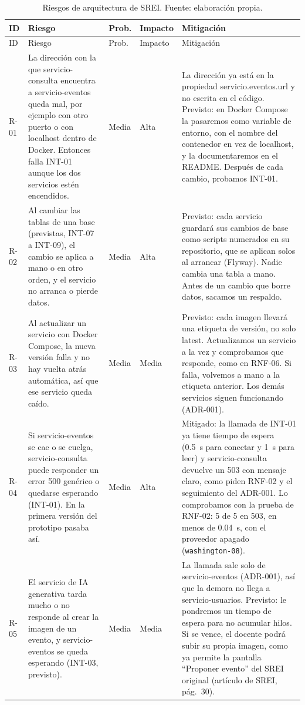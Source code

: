 {\small
\setlength{\tabcolsep}{4pt}
\begin{longtable}{p{} p{} p{} p{} p{}}
\caption{Riesgos de arquitectura de SREI. Fuente: elaboración propia.}\label{tab:riesgos}\\
\toprule
ID & Riesgo & Prob. & Impacto & Mitigación \\
\midrule
\endfirsthead
\toprule
ID & Riesgo & Prob. & Impacto & Mitigación \\
\midrule
\endhead
\bottomrule
\endfoot
R-01 & La dirección con la que servicio-consulta encuentra a servicio-eventos queda mal, por ejemplo con otro puerto o con localhost dentro de Docker. Entonces falla \mbox{INT-01} aunque los dos servicios estén encendidos. & Media & Alta & La dirección ya está en la propiedad servicio.eventos.url y no escrita en el código. Previsto: en Docker Compose la pasaremos como variable de entorno, con el nombre del contenedor en vez de localhost, y la documentaremos en el README. Después de cada cambio, probamos \mbox{INT-01}. \\
R-02 & Al cambiar las tablas de una base (previstas, \mbox{INT-07} a \mbox{INT-09}), el cambio se aplica a mano o en otro orden, y el servicio no arranca o pierde datos. & Media & Alta & Previsto: cada servicio guardará sus cambios de base como scripts numerados en su repositorio, que se aplican solos al arrancar (Flyway). Nadie cambia una tabla a mano. Antes de un cambio que borre datos, sacamos un respaldo. \\
R-03 & Al actualizar un servicio con Docker Compose, la nueva versión falla y no hay vuelta atrás automática, así que ese servicio queda caído. & Media & Media & Previsto: cada imagen llevará una etiqueta de versión, no solo latest. Actualizamos un servicio a la vez y comprobamos que responde, como en \mbox{RNF-06}. Si falla, volvemos a mano a la etiqueta anterior. Los demás servicios siguen funcionando (\mbox{ADR-001}). \\
R-04 & Si servicio-eventos se cae o se cuelga, servicio-consulta puede responder un error 500 genérico o quedarse esperando (\mbox{INT-01}). En la primera versión del prototipo pasaba así. & Media & Alta & Mitigado: la llamada de \mbox{INT-01} ya tiene tiempo de espera (0.5~s para conectar y 1~s para leer) y servicio-consulta devuelve un 503 con mensaje claro, como piden \mbox{RNF-02} y el seguimiento del \mbox{ADR-001}. Lo comprobamos con la prueba de \mbox{RNF-02}: 5 de 5 en 503, en menos de 0.04~s, con el proveedor apagado (\texttt{washington-08}). \\
R-05 & El servicio de IA generativa tarda mucho o no responde al crear la imagen de un evento, y servicio-eventos se queda esperando (\mbox{INT-03}, previsto). & Media & Media & La llamada sale solo de servicio-eventos (\mbox{ADR-001}), así que la demora no llega a servicio-usuarios. Previsto: le pondremos un tiempo de espera para no acumular hilos. Si se vence, el docente podrá subir su propia imagen, como ya permite la pantalla ``Proponer evento'' del SREI original (artículo de SREI, pág.~30). \\
\end{longtable}
}

